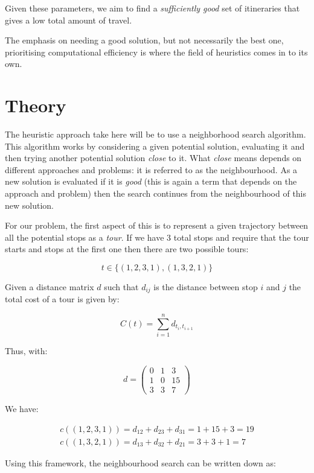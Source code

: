 Given these parameters, we aim to find a \emph{sufficiently good} set of
itineraries that gives a low total amount of travel.

The emphasis on needing a good solution, but not necessarily the best one,
prioritising computational efficiency is where the field of heuristics comes in
to its own.

\section{Theory}\label{sec:theory}

The heuristic approach take here will be to use a neighborhood search algorithm.
This algorithm works by considering a given potential solution, evaluating it
and then trying another potential solution \emph{close} to it. What \emph{close}
means depends on different approaches and problems: it is referred to as the
neighbourhood. As a new solution is evaluated if it is \emph{good} (this is
again a term that depends on the approach and problem) then the search
continues from the neighbourhood of this new solution.

For our problem,
the first aspect of this is to represent a given trajectory between all the
potential stops as a \emph{tour}. If we have 3 total stops and require that the
tour starts and stops at the first one then there are two possible tours:

\[
    t \in \{(1, 2, 3, 1), (1, 3, 2, 1)\}
\]

Given a distance matrix \(d\) such that \(d_{ij}\) is the distance between stop
\(i\) and \(j\) the total cost of a tour is given by:

\[
    C(t)=\sum_{i=1}^{n} d_{t_i, t_{i + 1}}
\]

Thus, with:

\[
    d = \begin{pmatrix}
        0 & 1 & 3\\
        1 & 0 & 15\\
        3 & 3 & 7
        \end{pmatrix}
\]

We have:

\begin{eqnarray*}
    c((1, 2, 3, 1)) = d_{12} + d_{23} + d_{31} = 1 + 15 + 3 = 19\\
    c((1, 3, 2, 1)) = d_{13} + d_{32} + d_{21} = 3 + 3 + 1 = 7
\end{eqnarray*}

Using this framework, the neighbourhood search can be written down as:


